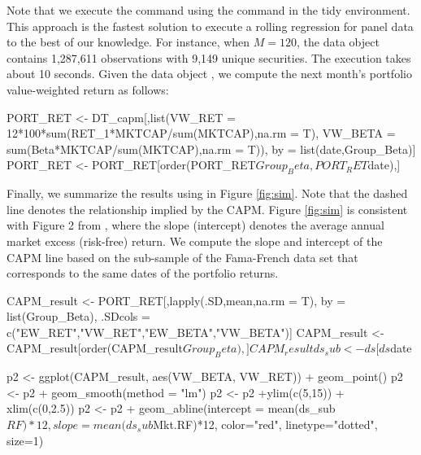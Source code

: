 Note that we execute the  command using the  command in the tidy environment. This approach is the fastest solution to execute a rolling regression for panel data to the best of our knowledge. For instance, when $M = 120$, the  data object contains 1,287,611 observations with 9,149 unique securities. The execution takes about 10 seconds.  Given the data object , we compute the next month's portfolio value-weighted return as follows:

\begin{Schunk}
\begin{Sinput}

PORT_RET <- DT_capm[,list(VW_RET = 12*100*sum(RET_1*MKTCAP/sum(MKTCAP),na.rm = T),
                          VW_BETA = sum(Beta*MKTCAP/sum(MKTCAP),na.rm = T)),
                    by = list(date,Group_Beta)]
PORT_RET <- PORT_RET[order(PORT_RET$Group_Beta,PORT_RET$date),]
\end{Sinput}
\end{Schunk}



Finally, we summarize the results using  in Figure \ref{fig:sim}. Note that the dashed line denotes the relationship implied by the CAPM. Figure \ref{fig:sim} is consistent with Figure 2 from \cite{fama2004capital}, where the slope (intercept) denotes the average annual market excess (risk-free) return. We compute the slope and intercept of the CAPM line based on the sub-sample of the Fama-French data set  that corresponds to the same dates of the portfolio returns.



\begin{Schunk}
\begin{Sinput}
CAPM_result <- PORT_RET[,lapply(.SD,mean,na.rm = T),
                        by = list(Group_Beta), 
                        .SDcols = c("EW_RET","VW_RET","EW_BETA","VW_BETA")]
CAPM_result <- CAPM_result[order(CAPM_result$Group_Beta),]
CAPM_result

ds_sub <- ds[ds$date %

p2 <- ggplot(CAPM_result, aes(VW_BETA, VW_RET)) +
  geom_point()
p2 <- p2 + geom_smooth(method = "lm")
p2 <- p2 +ylim(c(5,15)) + xlim(c(0,2.5))
p2 <- p2 + geom_abline(intercept = mean(ds_sub$RF)*12, 
                       slope = mean(ds_sub$Mkt.RF)*12, 
                       color="red", linetype="dotted", size=1)


\end{Sinput}
\end{Schunk}







